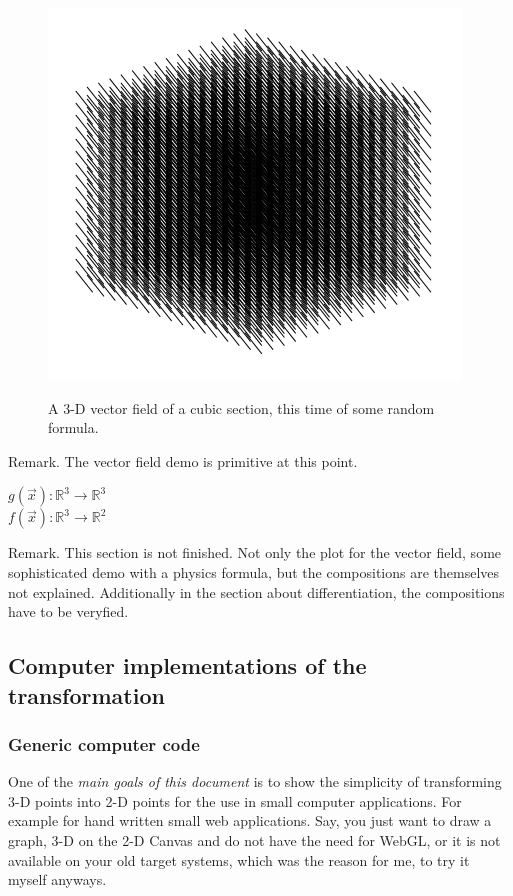 \documentclass[a4paper]{article}
\begin{document}
\begin{figure}
\includegraphics[scale=0.5]{vectorfield.png}
\label{vector_field_image}
\caption{A 3-D vector field of a cubic section, this time of some random formula.}
\end{figure}

Remark. The vector field demo is primitive at this point.

\begin{center}
$g(\vec{x}) : \mathbb{R}^{3} \rightarrow \mathbb{R}^{3}$\\
$f(\vec{x}) : \mathbb{R}^{3} \rightarrow \mathbb{R}^{2}$\\
\end{center}


Remark. This section is not finished. Not only the plot for the vector field, some sophisticated demo with a physics formula, but the compositions are themselves not explained. Additionally in the section about differentiation, the compositions have to be veryfied.\\


\subsection{Computer implementations of the transformation}
\subsubsection{Generic computer code}

One of the \emph{main goals of this document} is to show the simplicity of transforming 3-D points into 2-D points for the use in small computer applications. For example for hand written small web applications. Say, you just want to draw a graph, 3-D on the 
2-D Canvas and do not have the need for WebGL, or it is not available on your old target systems, which was the reason for me, to try it myself anyways.\\
\end{document}
